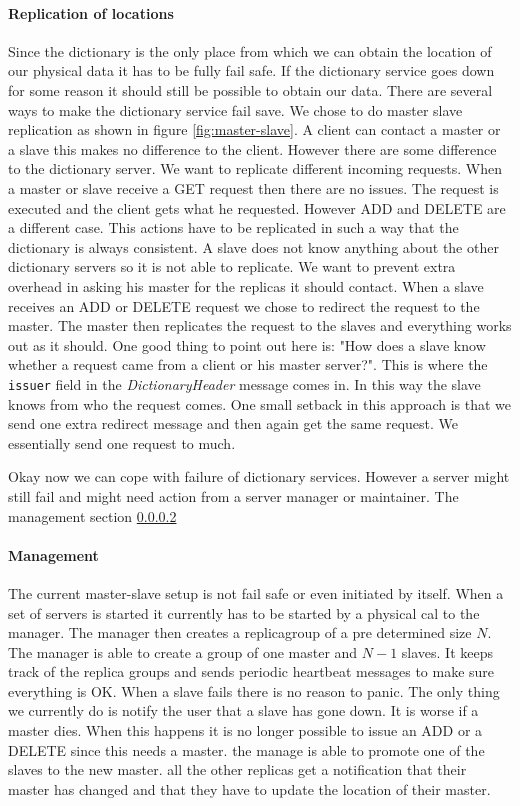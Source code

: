 \documentclass[12pt,a4paper]{scrartcl}
\begin{document}
\paragraph{Replication of locations}
Since the dictionary is the only place from which we can obtain the location of our physical data it has to be fully fail safe. If the dictionary service goes down for some reason it should still be possible to obtain our data. There are several ways to make the dictionary service fail save. We chose to do master slave replication as shown in figure \ref{fig:master-slave}. A client can contact a master or a slave this makes no difference to the client. However there are some difference to the dictionary server. We want to replicate different incoming requests. When a master or slave receive a GET request then there are no issues. The request is executed and the client gets what he requested. However ADD and DELETE are a different case. This actions have to be replicated in such a way that the dictionary is always consistent. A slave does not know anything about the other dictionary servers so it is not able to replicate. We want to prevent extra overhead in asking his master for the replicas it should contact. When a slave receives an ADD or DELETE request we chose to redirect the request to the master. The master then replicates the request to the slaves and everything works out as it should. One good thing to point out here is: "How does a slave know whether a request came from a client or his master server?". This is where the \texttt{issuer} field in the \textit{DictionaryHeader} message comes in. In this way the slave knows from who the request comes. One small setback in this approach is that we send one extra redirect message and then again get the same request. We essentially send one request to much.

Okay now we can cope with failure of dictionary services. However a server might still fail and might need action from a server manager or maintainer. The management section \ref{sec:management-dictionary}

\paragraph{Management}
\label{sec:management-dictionary}
The current master-slave setup is not fail safe or even initiated by itself. When a set of servers is started it currently has to be started by a physical cal to the manager. The manager then creates a replicagroup of a pre determined size $N$. The manager is able to create a group of one master and $N-1$ slaves. It keeps track of the replica groups and sends periodic heartbeat messages to make sure everything is OK. When a slave fails there is no reason to panic. The only thing we currently do is notify the user that a slave has gone down. It is worse if a master dies. When this happens it is no longer possible to issue an ADD or a DELETE since this needs a master. the manage is able to promote one of the slaves to the new master. all the other replicas get a notification that their master has changed and that they have to update the location of their master.
\end{document}
